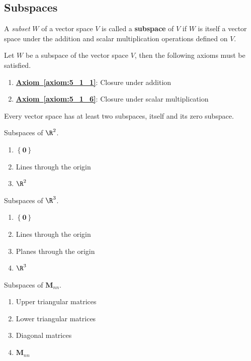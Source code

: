 \documentclass{article}
\begin{document}
\subsection{Subspaces}
\begin{definition}
    A \textit{subset} \(W\) of a vector space \(V\) is called a
    \textbf{subspace} of \(V\) if \(W\) is itself a vector space under
    the addition and scalar multiplication operations defined on \(V\).
\end{definition}
\begin{theorem}
    Let \(W\) be a subspace of the vector space \(V\), then the
    following axioms must be satisfied.
    \begin{enumerate}
        \item \textbf{\hyperref[axiom:5_1_1]{Axiom~\ref{axiom:5_1_1}}}:
              Closure under addition
        \item \textbf{\hyperref[axiom:5_1_6]{Axiom~\ref{axiom:5_1_6}}}:
              Closure under scalar multiplication
    \end{enumerate}
\end{theorem}
\begin{theorem}
    Every vector space has at least two subspaces, itself and its zero
    subspace.
\end{theorem}
\begin{theorem}
    Subspaces of \(\R^2\).
    \begin{enumerate}
        \item \(\left\{ \symbf{0} \right\}\)
        \item Lines through the origin
        \item \(\R^2\)
    \end{enumerate}
\end{theorem}
\begin{theorem}
    Subspaces of \(\R^3\).
    \begin{enumerate}
        \item \(\left\{ \symbf{0} \right\}\)
        \item Lines through the origin
        \item Planes through the origin
        \item \(\R^3\)
    \end{enumerate}
\end{theorem}
\begin{theorem}
    Subspaces of \(\symbf{M}_{nn}\).
    \begin{enumerate}
        \item Upper triangular matrices
        \item Lower triangular matrices
        \item Diagonal matrices
        \item \(\symbf{M}_{nn}\)
    \end{enumerate}
\end{theorem}
\end{document}
